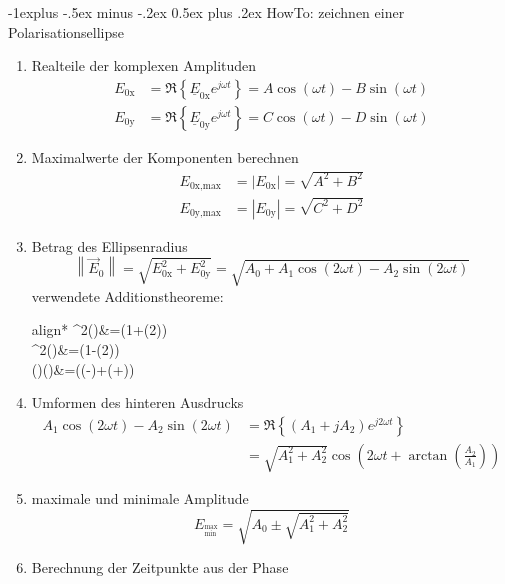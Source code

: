 \documentclass[10pt,a4paper,fleqn,landscape]{article}
\makeatletter
\renewcommand{\subsection}{\@startsection{subsection}{2}{0mm}%
                                {-1explus -.5ex minus -.2ex}%
                                {0.5ex plus .2ex}%
                                {\normalfont\normalsize\bfseries}}
\renewcommand{\c}[1]{\underline{#1}}			%
\newcommand{\norm}[1]{\left\lVert#1\right\rVert}	%
\makeatother
\begin{document}
\begin{multicols}{2}
\subsection{HowTo: zeichnen einer Polarisationsellipse}
\begin{enumerate}
	\item Realteile der komplexen Amplituden
		\begin{align*}
			E_{0\text{x}}&=\Re{\left\{ \c{E}_{0\text{x}}e^{j\omega t}\right\}} = A\cos(\omega t) - B\sin(\omega t) \\
			E_{0\text{y}}&=\Re{\left\{ \c{E}_{0\text{y}}e^{j\omega t}\right\}} = C\cos(\omega t) - D\sin(\omega t)
		\end{align*}
	\item Maximalwerte der Komponenten berechnen
		\begin{align*}
			E_{0\text{x,max}}&=|E_{0\text{x}}|=\sqrt{A^2+B^2}\\
			E_{0\text{y,max}}&=|E_{0\text{y}}|=\sqrt{C^2+D^2}
		\end{align*}
	\item Betrag des Ellipsenradius
		\begin{equation*}
			\norm{\vec{E}_0}=\sqrt{E^2_{0\text{x}}+E^2_{0\text{y}}}=\sqrt{A_0+A_1\cos(2\omega t)-A_2\sin(2\omega t)}
		\end{equation*}
		verwendete Additionstheoreme:
		\begin{empheq}[box=\fbox]{align*}
			\cos^2(\alpha)&=(1+\cos(2\alpha))\\
			\sin^2(\alpha)&=(1-\cos(2\alpha))\\
			\sin(\alpha)\cos(\beta)&=(\sin(\alpha-\beta)+\sin(\alpha+\beta))
		\end{empheq}
	\item Umformen des hinteren Ausdrucks
		\begin{align*}
			A_1\cos(2\omega t)-A_2\sin(2\omega t)&=\Re\left\{(A_1+jA_2)e^{j2\omega t}\right\}\\
			&=\sqrt{A_1^2+A_2^2}\cos\left(2\omega t+\arctan\left(\frac{A_2}{A_1}\right)\right)
		\end{align*}
	\item maximale und minimale Amplitude
		\begin{equation*}
			E_{^\text{max}_\text{min}}=\sqrt{A_0\pm\sqrt{A_1^2+A_2^2}}
		\end{equation*}
	\item Berechnung der Zeitpunkte aus der Phase
		\begin{equation*}

\end{equation*}
\end{enumerate}
\end{multicols}
\end{document}

